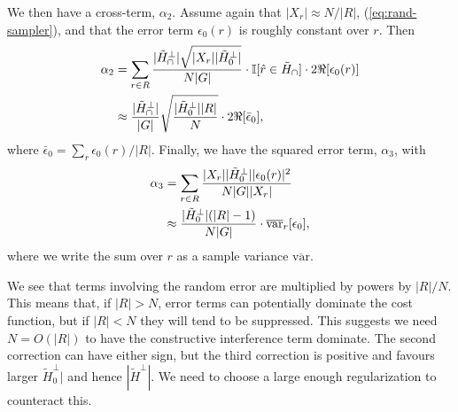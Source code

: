 \documentclass[aps, pre,reprint,nofootinbib,citeautoscript,floatfix]{revtex4-1}
\begin{document}
We then have a cross-term, $\alpha_2$. Assume again that $|X_r| \approx N/|R|$, (\ref{eq:rand-sampler}), and that the error term $\epsilon_0(r)$ is roughly constant over $r$. Then
\begin{align*}
    \alpha_2 & = \sum_{r\in R} \frac{|\tilde{H}_\cap^\perp| \sqrt{|X_r||\tilde{H}_0^\perp|}}{N|G|} \cdot \mathbb{I}[\hat{r}\in \tilde{H}_\cap]\cdot 2\Re[\epsilon_0(r)] \notag \\
    & \approx \frac{|\tilde{H}^\perp_\cap|}{|G|}\sqrt{\frac{|\tilde{H}_0^\perp| |R|}{N}} \cdot 2\Re[\bar{\epsilon}_0], \label{eq:alpha_2}
\end{align*}
where $\bar{\epsilon}_0 = \sum_r\epsilon_0(r)/|R|$.
Finally, we have the squared error term, $\alpha_3$, with
\begin{align}
    \alpha_3 & = \sum_{r\in R}\frac{|X_r||\tilde{H}^\perp_0| |\epsilon_0(r)|^2}{N|G||X_r|} \notag \\
    & \approx \frac{|\tilde{H}^\perp_0|(|R|-1)}{N|G|}\cdot \overline{\mbox{var}}_r[\epsilon_0],
\end{align}
where we write the sum over $r$ as a sample variance $\overline{\mbox{var}}$.

We see that terms involving the random error are multiplied by powers by $|R|/N$. This means that, if $|R| > N$, error terms can potentially dominate the cost function, but if $|R| < N$ they will tend to be suppressed. This suggests we need $N = O(|R|)$ to have the constructive interference term dominate.
The second correction can have either sign, but the third correction is positive and favours larger $\tilde{H}_0^\perp|$ and hence $|\tilde{H}^\perp|$. We need to choose a large enough regularization to counteract this.

\vfill
\end{document}
